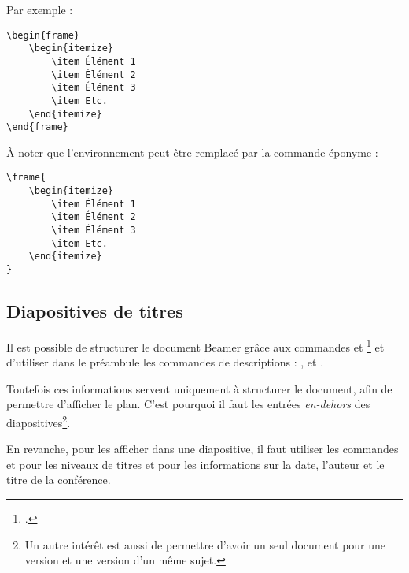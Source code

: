 Par exemple :

\begin{verbatim}
\begin{frame}
	\begin{itemize}
		\item Élément 1
		\item Élément 2
		\item Élément 3
		\item Etc.
	\end{itemize}
\end{frame}
\end{verbatim}

À noter que l'environnement   peut être remplacé par la commande éponyme :

\begin{verbatim}
\frame{
	\begin{itemize}
		\item Élément 1
		\item Élément 2
		\item Élément 3
		\item Etc.
	\end{itemize}
}
\end{verbatim}

\subsection{Diapositives de titres}

Il est possible de structurer le document Beamer grâce aux commandes  et \footcite[Le manuel de  déconseille d'utiliser   parce que \enquote{c'est le diable}.][]{beamer_diable} et d'utiliser dans le préambule les commandes de descriptions : ,  et .

Toutefois ces informations servent uniquement à structurer le document, afin de permettre d'afficher le plan. C'est pourquoi il faut les entrées \emph{en-dehors} des diapositives\footnote{Un  autre intérêt est aussi de permettre d'avoir un seul document pour une version  et une version  d'un même sujet.}.

En revanche, pour les afficher dans une diapositive, il faut utiliser les commandes  et  pour les niveaux de titres et  pour les informations sur la date, l'auteur et le titre de la conférence.

